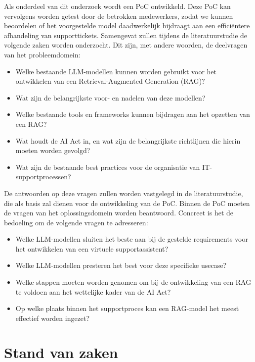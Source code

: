 Als onderdeel van dit onderzoek wordt een PoC ontwikkeld. Deze PoC kan vervolgens worden getest door de betrokken medewerkers, zodat we kunnen beoordelen of het voorgestelde model daadwerkelijk bijdraagt aan een efficiëntere afhandeling van supporttickets. Samengevat zullen tijdens de literatuurstudie de volgende zaken worden onderzocht. Dit zijn, met andere woorden, de deelvragen van het probleemdomein:

\begin{itemize} 
    \item Welke bestaande LLM-modellen kunnen worden gebruikt voor het ontwikkelen van een Retrieval-Augmented Generation (RAG)? 
    \item Wat zijn de belangrijkste voor- en nadelen van deze modellen? 
    \item Welke bestaande tools en frameworks kunnen bijdragen aan het opzetten van een RAG? 
    \item Wat houdt de AI Act in, en wat zijn de belangrijkste richtlijnen die hierin moeten worden gevolgd? 
    \item Wat zijn de bestaande best practices voor de organisatie van IT-supportprocessen? 
\end{itemize}

De antwoorden op deze vragen zullen worden vastgelegd in de literatuurstudie, die als basis zal dienen voor de ontwikkeling van de PoC. Binnen de PoC moeten de vragen van het oplossingsdomein worden beantwoord. Concreet is het de bedoeling om de volgende vragen te adresseren:

\begin{itemize} 
    \item Welke LLM-modellen sluiten het beste aan bij de gestelde requirements voor het ontwikkelen van een virtuele supportassistent? 
    \item Welke LLM-modellen presteren het best voor deze specifieke usecase? 
    \item Welke stappen moeten worden genomen om bij de ontwikkeling van een RAG te voldoen aan het wettelijke kader van de AI Act? 
    \item Op welke plaats binnen het supportproces kan een RAG-model het meest effectief worden ingezet?
\end{itemize}


\section{Stand van zaken}%
\label{sec:stand van zaken}

